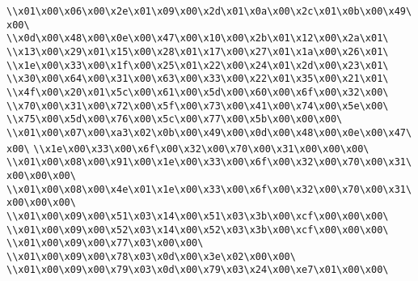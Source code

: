 \verb|\\x01\x00\x06\x00\x2e\x01\x09\x00\x2d\x01\x0a\x00\x2c\x01\x0b\x00\x49\x00\|\newline
\verb|\\x0d\x00\x48\x00\x0e\x00\x47\x00\x10\x00\x2b\x01\x12\x00\x2a\x01\|\newline
\verb|\\x13\x00\x29\x01\x15\x00\x28\x01\x17\x00\x27\x01\x1a\x00\x26\x01\|\newline
\verb|\\x1e\x00\x33\x00\x1f\x00\x25\x01\x22\x00\x24\x01\x2d\x00\x23\x01\|\newline
\verb|\\x30\x00\x64\x00\x31\x00\x63\x00\x33\x00\x22\x01\x35\x00\x21\x01\|\newline
\verb|\\x4f\x00\x20\x01\x5c\x00\x61\x00\x5d\x00\x60\x00\x6f\x00\x32\x00\|\newline
\verb|\\x70\x00\x31\x00\x72\x00\x5f\x00\x73\x00\x41\x00\x74\x00\x5e\x00\|\newline
\verb|\\x75\x00\x5d\x00\x76\x00\x5c\x00\x77\x00\x5b\x00\x00\x00\|\newline
\verb|\\x01\x00\x07\x00\xa3\x02\x0b\x00\x49\x00\x0d\x00\x48\x00\x0e\x00\x47\x00\|\newline
\verb|\\x1e\x00\x33\x00\x6f\x00\x32\x00\x70\x00\x31\x00\x00\x00\|\newline
\verb|\\x01\x00\x08\x00\x91\x00\x1e\x00\x33\x00\x6f\x00\x32\x00\x70\x00\x31\x00\x00\x00\|\newline
\verb|\\x01\x00\x08\x00\x4e\x01\x1e\x00\x33\x00\x6f\x00\x32\x00\x70\x00\x31\x00\x00\x00\|\newline
\verb|\\x01\x00\x09\x00\x51\x03\x14\x00\x51\x03\x3b\x00\xcf\x00\x00\x00\|\newline
\verb|\\x01\x00\x09\x00\x52\x03\x14\x00\x52\x03\x3b\x00\xcf\x00\x00\x00\|\newline
\verb|\\x01\x00\x09\x00\x77\x03\x00\x00\|\newline
\verb|\\x01\x00\x09\x00\x78\x03\x0d\x00\x3e\x02\x00\x00\|\newline
\verb|\\x01\x00\x09\x00\x79\x03\x0d\x00\x79\x03\x24\x00\xe7\x01\x00\x00\|\newline
